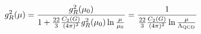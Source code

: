 \begin{equation}
  g_R^2(\mu) = {g_R^2(\mu_0) \over 1+ {22 \over 3}{C_2(G) \over (4\pi)^2}g_R^2(\mu_0) \ln {\mu \over \mu_0}} 
  = {1 \over {22 \over 3}{C_2(G) \over (4\pi)^2} \ln {\mu \over \Lambda_{\rm QCD}}}  
\label{betasol}
\end{equation}

